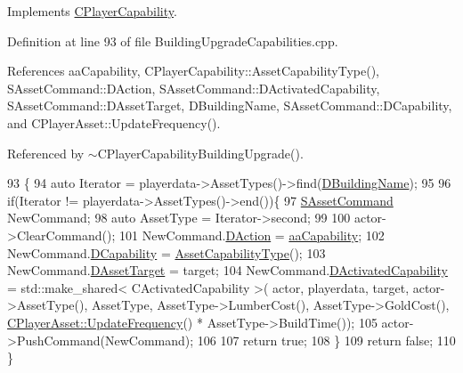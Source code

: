Implements \hyperlink{classCPlayerCapability_a2ca6fd7fbd9c0178f1cf1d049c63825f}{C\+Player\+Capability}.



Definition at line 93 of file Building\+Upgrade\+Capabilities.\+cpp.



References aa\+Capability, C\+Player\+Capability\+::\+Asset\+Capability\+Type(), S\+Asset\+Command\+::\+D\+Action, S\+Asset\+Command\+::\+D\+Activated\+Capability, S\+Asset\+Command\+::\+D\+Asset\+Target, D\+Building\+Name, S\+Asset\+Command\+::\+D\+Capability, and C\+Player\+Asset\+::\+Update\+Frequency().



Referenced by $\sim$\+C\+Player\+Capability\+Building\+Upgrade().


\begin{DoxyCode}
93                                                                                                            
                                                                   \{
94     \textcolor{keyword}{auto} Iterator = playerdata->AssetTypes()->find(\hyperlink{classCPlayerCapabilityBuildingUpgrade_a244e767a3e669441cfb03c13bf703e64}{DBuildingName});
95     
96     \textcolor{keywordflow}{if}(Iterator != playerdata->AssetTypes()->end())\{
97         \hyperlink{structSAssetCommand}{SAssetCommand} NewCommand;
98         \textcolor{keyword}{auto} AssetType = Iterator->second;
99         
100         actor->ClearCommand();
101         NewCommand.\hyperlink{structSAssetCommand_a8edd3b3d59a76d5514ba403bc8076a75}{DAction} = \hyperlink{GameDataTypes_8h_ab47668e651a3032cfb9c40ea2d60d670acf9fb164e8abd71c71f4a8c7fda360d4}{aaCapability};
102         NewCommand.\hyperlink{structSAssetCommand_a734ea7c6847457b437360f333f570ff9}{DCapability} = \hyperlink{classCPlayerCapability_a433bb196cd6ab6a932f1cac102b3aa98}{AssetCapabilityType}();
103         NewCommand.\hyperlink{structSAssetCommand_a3d9b43f6e59c386c48c41a65448a0c39}{DAssetTarget} = target;
104         NewCommand.\hyperlink{structSAssetCommand_ad8beda19520811cc70fe1eab16c774dd}{DActivatedCapability} = std::make\_shared< CActivatedCapability >(
      actor, playerdata, target, actor->AssetType(), AssetType, AssetType->LumberCost(), AssetType->GoldCost(), 
      \hyperlink{classCPlayerAsset_a0aff85b9552967a42f4f3f42cb59c19f}{CPlayerAsset::UpdateFrequency}() * AssetType->BuildTime());
105         actor->PushCommand(NewCommand);
106         
107         \textcolor{keywordflow}{return} \textcolor{keyword}{true};
108     \}
109     \textcolor{keywordflow}{return} \textcolor{keyword}{false};
110 \}
\end{DoxyCode}
